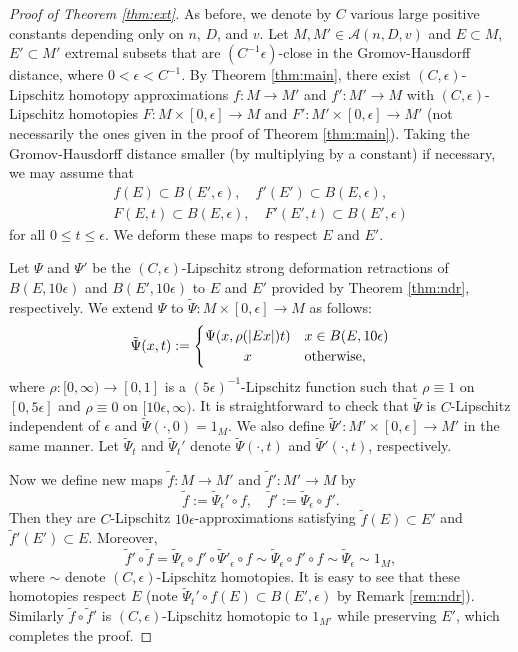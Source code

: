 \documentclass[a4paper,12pt]{amsart}
\theoremstyle{plain}
\theoremstyle{definition}
\numberwithin{thm}{section}
\numberwithin{equation}{section}
\begin{document}
\begin{proof}[Proof of Theorem \ref{thm:ext}]
As before, we denote by $C$ various large positive constants depending only on $n$, $D$, and $v$.
Let $M,M'\in\mathcal A(n,D,v)$ and $E\subset M$, $E'\subset M'$ extremal subsets that are $(C^{-1}\epsilon)$-close in the Gromov-Hausdorff distance, where $0<\epsilon<C^{-1}$.
By Theorem \ref{thm:main}, there exist $(C,\epsilon)$-Lipschitz homotopy approximations $f:M\to M'$ and $f':M'\to M$ with $(C,\epsilon)$-Lipschitz homotopies $F:M\times[0,\epsilon]\to M$ and $F':M'\times[0,\epsilon]\to M'$ (not necessarily the ones given in the proof of Theorem \ref{thm:main}).
Taking the Gromov-Hausdorff distance smaller (by multiplying by a constant) if necessary, we may assume that
\begin{gather*}
f(E)\subset B(E',\epsilon),\quad f'(E')\subset B(E,\epsilon),\\
F(E,t)\subset B(E,\epsilon),\quad F'(E',t)\subset B(E',\epsilon)
\end{gather*}
for all $0\le t\le\epsilon$.
We deform these maps to respect $E$ and $E'$.

Let $\Psi$ and $\Psi'$ be the $(C,\epsilon)$-Lipschitz strong deformation retractions of $B(E,10\epsilon)$ and $B(E',10\epsilon)$ to $E$ and $E'$ provided by Theorem \ref{thm:ndr}, respectively.
We extend $\Psi$ to $\tilde\Psi:M\times[0,\epsilon]\to M$ as follows:
\[
\tilde\Psi(x,t):=
\begin{cases}
\Psi(x,\rho(|Ex|)t) & x\in B(E,10\epsilon)\\
\hfil x & \text{otherwise},
\end{cases}
\]
where $\rho:[0,\infty)\to[0,1]$ is a $(5\epsilon)^{-1}$-Lipschitz function such that $\rho\equiv1$ on $[0,5\epsilon]$ and $\rho\equiv0$ on $[10\epsilon,\infty)$.
It is straightforward to check that $\tilde \Psi$ is $C$-Lipschitz independent of $\epsilon$ and $\tilde\Psi(\cdot,0)=1_M$.
We also define $\tilde\Psi':M'\times[0,\epsilon]\to M'$ in the same manner.
Let $\tilde\Psi_t$ and $\tilde\Psi_t'$ denote $\tilde\Psi(\cdot,t)$ and $\tilde\Psi'(\cdot,t)$, respectively.

Now we define new maps $\tilde f:M\to M'$ and $\tilde f':M'\to M$ by
\[\tilde f:=\tilde \Psi_\epsilon'\circ f,\quad\tilde  f':=\tilde\Psi_\epsilon\circ f'.\]
Then they are $C$-Lipschitz $10\epsilon$-approximations satisfying $\tilde f(E)\subset E'$ and $\tilde f'(E')\subset E$.
Moreover,
\[\tilde f'\circ\tilde f=\tilde\Psi_\epsilon\circ f'\circ\tilde \Psi'_\epsilon\circ f\sim\tilde\Psi_\epsilon\circ f'\circ f\sim\tilde\Psi_\epsilon\sim1_M,\]
where $\sim$ denote $(C,\epsilon)$-Lipschitz homotopies.
It is easy to see that these homotopies respect $E$ (note $\tilde\Psi_t'\circ f(E)\subset B(E',\epsilon)$ by Remark \ref{rem:ndr}).
Similarly $\tilde f\circ\tilde f'$ is $(C,\epsilon)$-Lipschitz homotopic to $1_{M'}$ while preserving $E'$, which completes the proof.
\end{proof}
\end{document}
